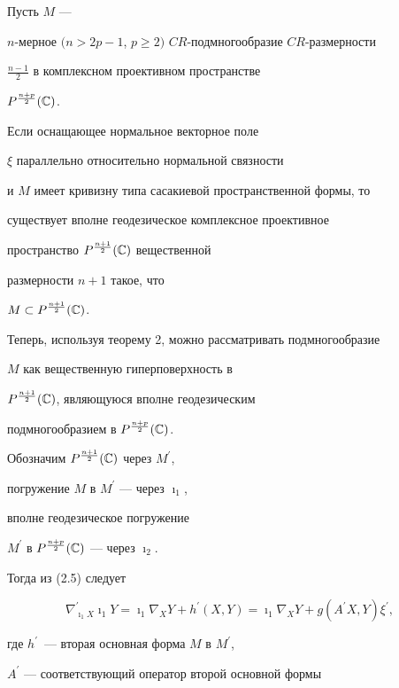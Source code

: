 \begin{thm}


Пусть $M$ ---


$n$-мерное $(n>2p-1$, $p\ge 2)$ $CR$-подмногообразие $CR$-размерности


$\frac{n-1}{2}$ в комплексном проективном пространстве


$P^{\frac{n+p}{2}}(\Bbb C)$.


Если оснащающее нормальное векторное поле


$\xi$ параллельно относительно нормальной связности


и $M$ имеет кривизну типа сасакиевой пространственной формы, то


существует вполне геодезическое комплексное проективное


пространство $P^{\frac{n+1}{2}}(\Bbb C)$ вещественной


размерности $n+1$ такое, что


$M\subset P^{\frac{n+1}{2}}(\Bbb C)$.


\end{thm}








Теперь, используя теорему 2, можно рассматривать подмногообразие


$M$ как вещественную гиперповерхность в


$P^{\frac{n+1}{2}}(\Bbb C)$, являющуюся вполне геодезическим


подмногообразием  в $P^{\frac{n+p}{2}}(\Bbb C)$. 


Обозначим $P^{\frac{n+1}{2}}(\Bbb C)$ через $M^\prime$,


погружение $M$ в $M^\prime$ --- через $\imath_1$, 


вполне геодезическое погружение


$M^\prime$ в $P^{\frac{n+p}{2}}(\Bbb C)$ --- через $\imath_2$.


Тогда из (2.5) следует


$$


\nabla^\prime_{\imath_1 X}\imath_1Y=


\imath_1 \nabla_XY+h^\prime(X,Y)=\imath_1\nabla_XY+


g(A^\prime X,Y)\xi^\prime,


$$


где $h^\prime$~--- вторая основная форма $M$ в $M^\prime$,


$A^\prime$ --- соответствующий оператор второй основной формы


